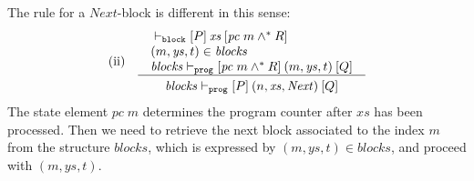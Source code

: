 \documentclass[sigplan,10pt,review]{acmart}\settopmatter{printfolios=true,printccs=false,printacmref=false}
\newcommand{\sconj}{\wedge^*}
\newcommand{\ttrip}[5]{\mathit{#1} \vdash_{\mathrm{#2}}[#3]\:#4\:[#5]}
\newcommand{\pc}{\mathit{pc}}
\newcommand{\RuleC}[2]{\begin{array}{c}#1\\\hline\noalign{\smallskip}#2\end{array}}
\begin{document}
The rule for a $\mathit{Next}$-block is different in this sense:
\[
\begin{array}{l l}
\mbox{(ii)} & \RuleC{\begin{array}{l} \ttrip{}{\mathtt{block}}{P}{\mathit{xs}}{\pc\;m \sconj R} \\
                                      (m, \mathit{ys},t) \in \mathit{blocks} \\
                                       \ttrip{\mathit{blocks}}{\mathtt{prog}}{\pc\;m \sconj R}{(m, \mathit{ys},t)}{Q}
                     \end{array}}
     {\ttrip{\mathit{blocks}}{\mathtt{prog}}{P}{(n, \mathit{xs}, \mathit{Next})}{Q}}
\end{array}
\]
The state element $\pc\;m$ determines the program counter after $\mathit{xs}$ has been
processed. Then we need to retrieve the next block associated to the index $m$ from the structure $\mathit{blocks}$,
which is expressed by $(m, \mathit{ys},t) \in \mathit{blocks}$, and proceed with 
$(m, \mathit{ys},t)$.
\end{document}
